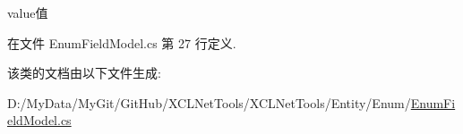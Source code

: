 value值 



在文件 Enum\-Field\-Model.\-cs 第 27 行定义.



该类的文档由以下文件生成\-:\begin{DoxyCompactItemize}
\item 
D\-:/\-My\-Data/\-My\-Git/\-Git\-Hub/\-X\-C\-L\-Net\-Tools/\-X\-C\-L\-Net\-Tools/\-Entity/\-Enum/\hyperlink{_enum_field_model_8cs}{Enum\-Field\-Model.\-cs}\end{DoxyCompactItemize}
